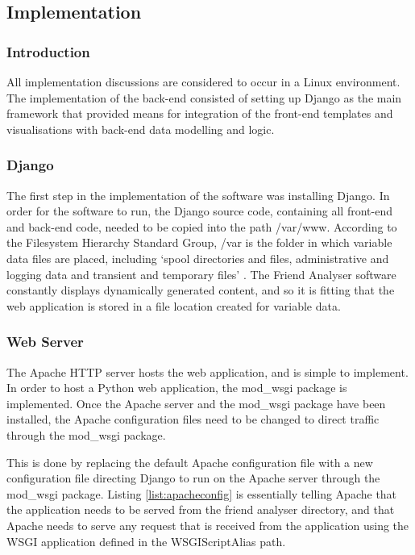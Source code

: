 \documentclass[12pt,onecolumn]{article}
\begin{document}
	\subsection{Implementation} %
	
	\subsubsection{Introduction}
	
	All implementation discussions are considered to occur in a Linux environment.
	The implementation of the back-end consisted of setting up Django as the main framework that provided means for integration of the front-end templates and visualisations with back-end data modelling and logic. 
	
	\subsubsection{Django}
	
	The first step in the implementation of the software was installing Django. In order for the software to run, the Django source code, containing all front-end and back-end code, needed to be copied into the path /var/www. According to the Filesystem Hierarchy Standard Group, /var is the folder in which variable data files are placed, including `spool directories and files, administrative and logging data and transient and temporary files' \cite{FHS}. The Friend Analyser software constantly displays dynamically generated content, and so it is fitting that the web application is stored in a file location created for variable data.
	
	\subsubsection{Web Server} 
	
	The Apache HTTP server hosts the web application, and is simple to implement. In order to host a Python web application, the mod\_wsgi package is implemented. Once the Apache server and the mod\_wsgi package have been installed, the Apache configuration files need to be changed to direct traffic through the mod\_wsgi package. 
	
	This is done by replacing the default Apache configuration file with a new configuration file directing Django to run on the Apache server through  the mod\_wsgi package. Listing \ref{list:apacheconfig} is essentially telling Apache that the application needs to be served from the friend analyser directory, and that Apache needs to serve any request that is received from the application using the WSGI application defined in the WSGIScriptAlias path.
	
\end{document}
